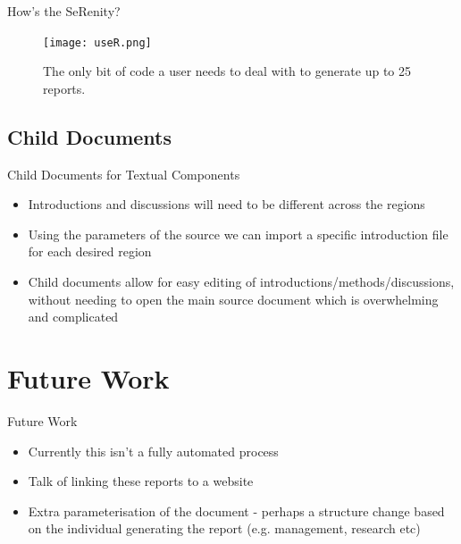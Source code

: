 \documentclass{beamer}
\begin{document}
                \begin{frame}{How's the SeRenity?}
                    \begin{figure}
                        \centering
                        \texttt{[image: useR.png]}
                        \caption{The only bit of code a user needs to deal with to generate up to 25 reports.}
                    \end{figure}

                \end{frame}

          \subsection{Child Documents}
              \begin{frame}{Child Documents for Textual Components}
                  \begin{itemize}
                    \item Introductions and discussions will need to be different across the regions
                    \item Using the parameters of the source we can import a specific introduction file for each desired region
                    \item Child documents allow for easy editing of introductions/methods/discussions, without needing to open the main source document which is overwhelming and complicated
                  \end{itemize}
              \end{frame}

      \section{Future Work}
        \begin{frame}{Future Work}
          \begin{itemize}
            \item Currently this isn't a fully automated process
            \item Talk of linking these reports to a website
            \item Extra parameterisation of the document - perhaps a structure change based on the individual generating the report (e.g. management, research etc)
          \end{itemize}
        \end{frame}

\appendix
\end{document}
